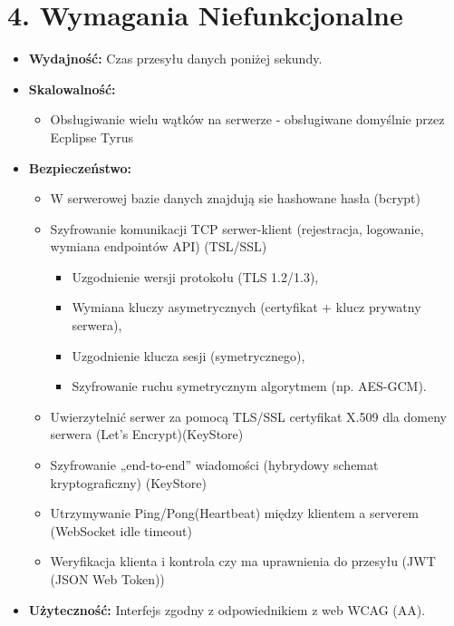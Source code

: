 \documentclass[a4paper,12pt]{article}
\begin{document}
\section*{4. Wymagania Niefunkcjonalne}

\vspace{0.5 cm}
 \noindent
\begin{itemize}
    \item \textbf{Wydajność:} Czas przesyłu danych poniżej sekundy.
    \item \textbf{Skalowalność:}
        \begin{itemize}
        \item Obsługiwanie wielu wątków na serwerze - obsługiwane domyślnie przez Ecplipse Tyrus
        \end{itemize}
    \item \textbf{Bezpieczeństwo:}
        \begin{itemize}
            \item W serwerowej bazie danych znajdują sie hashowane hasła (bcrypt)
            \item Szyfrowanie komunikacji TCP serwer-klient (rejestracja, logowanie, wymiana endpointów API) (TSL/SSL)
            \begin{itemize}
                \item Uzgodnienie wersji protokołu (TLS 1.2/1.3),
                \item Wymiana kluczy asymetrycznych (certyfikat + klucz prywatny serwera),
                \item Uzgodnienie klucza sesji (symetrycznego),
                \item Szyfrowanie ruchu symetrycznym algorytmem (np. AES-GCM).
            \end{itemize}
            \item Uwierzytelnić serwer za pomocą TLS/SSL certyfikat X.509 dla domeny serwera (Let’s Encrypt)(KeyStore)
            \item Szyfrowanie „end-to-end” wiadomości (hybrydowy schemat kryptograficzny) (KeyStore)
            \item Utrzymywanie Ping/Pong(Heartbeat) między klientem a serverem (WebSocket idle timeout)
            \item Weryfikacja klienta i kontrola czy ma uprawnienia do przesyłu (JWT (JSON Web Token))
        \end{itemize}
    \item \textbf{Użyteczność:} Interfejs zgodny z odpowiednikiem z web WCAG (AA).
\end{itemize}
\end{document}
